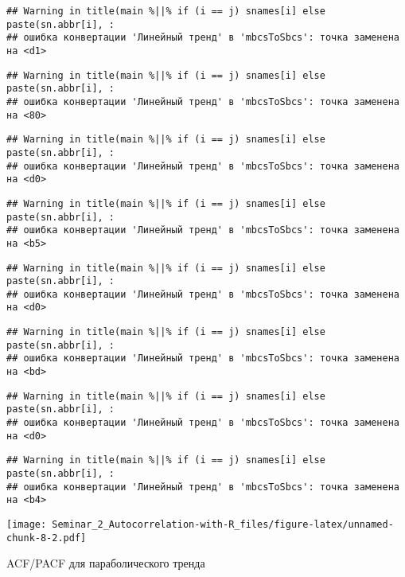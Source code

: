 \documentclass[
]{article}
\begin{document}
\begin{verbatim}
## Warning in title(main %||% if (i == j) snames[i] else paste(sn.abbr[i], :
## ошибка конвертации 'Линейный тренд' в 'mbcsToSbcs': точка заменена на <d1>
\end{verbatim}

\begin{verbatim}
## Warning in title(main %||% if (i == j) snames[i] else paste(sn.abbr[i], :
## ошибка конвертации 'Линейный тренд' в 'mbcsToSbcs': точка заменена на <80>
\end{verbatim}

\begin{verbatim}
## Warning in title(main %||% if (i == j) snames[i] else paste(sn.abbr[i], :
## ошибка конвертации 'Линейный тренд' в 'mbcsToSbcs': точка заменена на <d0>
\end{verbatim}

\begin{verbatim}
## Warning in title(main %||% if (i == j) snames[i] else paste(sn.abbr[i], :
## ошибка конвертации 'Линейный тренд' в 'mbcsToSbcs': точка заменена на <b5>
\end{verbatim}

\begin{verbatim}
## Warning in title(main %||% if (i == j) snames[i] else paste(sn.abbr[i], :
## ошибка конвертации 'Линейный тренд' в 'mbcsToSbcs': точка заменена на <d0>
\end{verbatim}

\begin{verbatim}
## Warning in title(main %||% if (i == j) snames[i] else paste(sn.abbr[i], :
## ошибка конвертации 'Линейный тренд' в 'mbcsToSbcs': точка заменена на <bd>
\end{verbatim}

\begin{verbatim}
## Warning in title(main %||% if (i == j) snames[i] else paste(sn.abbr[i], :
## ошибка конвертации 'Линейный тренд' в 'mbcsToSbcs': точка заменена на <d0>
\end{verbatim}

\begin{verbatim}
## Warning in title(main %||% if (i == j) snames[i] else paste(sn.abbr[i], :
## ошибка конвертации 'Линейный тренд' в 'mbcsToSbcs': точка заменена на <b4>
\end{verbatim}

\texttt{[image: Seminar\_2\_Autocorrelation-with-R\_files/figure-latex/unnamed-chunk-8-2.pdf]}

ACF/PACF для параболического тренда
\end{document}
